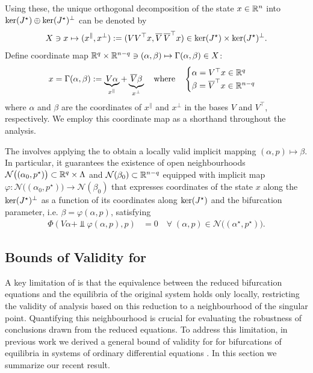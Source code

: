 \documentclass[letterpaper, 10 pt, conference]{ieeeconf}
\begin{document}
Using these, the unique orthogonal decomposition of the state \(x\in\R[n]\) into \(\kerJ \oplus \kerJ^{\perp}\) can be denoted by
\begin{equation*}
    X \ni x \mapsto (x^{\parallel},x^{\perp}) := (VV^{\top} x, \Vbar\,\Vbar^{\top} x) \in \kerJ \times \kerJ^{\perp}.
\end{equation*}
Define coordinate map \(\R[q] \times \R[n-q] \ni (\alpha,\beta) \mapsto \Gamma(\alpha,\beta) \in X\):
\begin{equation}
    x = \Gamma(\alpha,\beta) := \underbrace{V\alpha}_{x^\parallel} + \underbrace{\Vbar\beta}_{x^\perp} \quad\text{where}\quad \begin{cases} \alpha = V^{\top}x \in \R[q] \\ \beta = \Vbar^{\top}x \in \R[n-q] \end{cases} \label{def:split}
\end{equation}
where \(\alpha\) and \(\beta\) are the coordinates of \(x^{\parallel}\) and \(x^{\perp}\) in the bases \(V\) and \(V^{\top}\), respectively. We employ this coordinate map as a shorthand throughout the analysis.

The \LSR{} involves applying the \ImFT{} to obtain a locally valid implicit mapping \((\alpha,p) \mapsto \beta\). In particular, it guarantees the existence of open neighbourhoods \(\mathcal{N}\big((\alpha_0,p^{\star})\big) \subset \R[q] \times \Lambda\) and \(\mathcal{N}(\beta_0) \subset \R[n-q]\) equipped with implicit map \(\varphi:\mathcal{N}\big((\alpha_0,p^{\star})\big) \to \mathcal{N}(\beta_0) \)
that expresses coordinates of the state \(x\) along the \(\kerJ^{\perp}\) as a function of its coordinates along \(\kerJ\) and the bifurcation parameter, i.e. \(\beta = \varphi(\alpha,p)\), satisfying
%
\begin{align}
    \Phi(V\alpha+\Vbar\varphi(\alpha,p),p) & = 0\quad\forall\;(\alpha,p)\in\mathcal{N}\big((\alpha^{\star},p^{\star})\big). \label{eq:LSRmap}
\end{align}


\subsection{Bounds of Validity for \LSR{} \label{subsec:LSR-bounds}}

A key limitation of \LSR{} is that the equivalence between the reduced bifurcation equations and the equilibria of the original system holds only locally, restricting the validity of analysis based on this reduction to a neighbourhood of the singular point. Quantifying this neighbourhood is crucial for evaluating the robustness of conclusions drawn from the reduced equations. To address this limitation, in previous work we derived a general bound of validity for \LSR{} for bifurcations of equilibria in systems of ordinary differential equations \cite{gupta2024estimates}. In this section we summarize our recent result.
\end{document}
